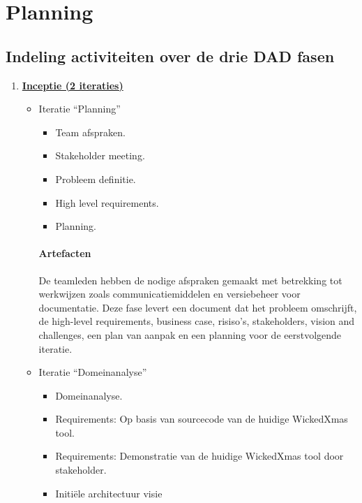 
\section{Planning}
\subsection{Indeling activiteiten over de drie DAD fasen}
\begin{enumerate}
\item \underline{\textbf{Inceptie (2 iteraties)}}
		\begin{itemize}
		\item Iteratie ``Planning''
			\begin{itemize}
			\item Team afspraken.
			\item Stakeholder meeting.
			\item Probleem definitie.
			\item High level requirements.
			\item Planning.
			\end{itemize}
		\paragraph{Artefacten}
		De teamleden hebben de nodige afspraken gemaakt met betrekking tot
		werkwijzen zoals communicatiemiddelen en versiebeheer voor documentatie.
		Deze fase levert een document dat het probleem omschrijft,  de
		high-level requirements, business case, risiso's, stakeholders, vision
		and challenges, een plan van aanpak en een planning voor de eerstvolgende
		iteratie.
		\item Iteratie ``Domeinanalyse''
			\begin{itemize}
			\item Domeinanalyse.
			\item Requirements: Op basis van sourcecode van de huidige WickedXmas tool.
			\item Requirements: Demonstratie van de huidige WickedXmas tool door
			stakeholder.
			\item Initi\"ele architectuur visie
			\end{itemize}

\end{itemize}
\end{enumerate}
